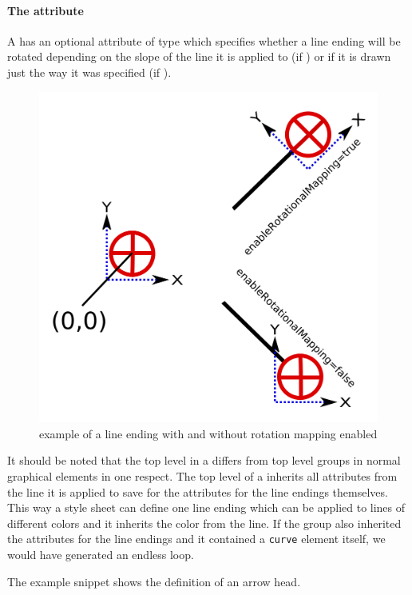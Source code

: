 \paragraph{The \fixttspace{} attribute}

A \LineEnding has an optional attribute 
of type  which specifies whether a line ending
will be rotated depending on the slope of the line it is applied to (if ) or if it is
drawn just the way it was specified (if ).
\begin{figure}[h!]
\begin{center}
\includegraphics[scale=0.15]{figures/EnableRotationalMapping.png}
\end{center}
\caption{example of a line ending with and without rotation mapping enabled}
\label{EnableRotationalMapping}
\end{figure}

It should be noted that the top level \RenderGroup in a \LineEnding differs from top level groups in normal graphical elements in one respect. The top level \RenderGroup of a \LineEnding inherits all attributes from the line it is applied to save for the attributes for the line endings themselves. This way a style sheet can define one line ending which can be applied to lines of different colors and it inherits the color from the line.
If the group also inherited the attributes for the line endings and it contained a \texttt{curve} element itself, we would have generated an endless loop.

The example snippet shows the definition of an arrow head.



